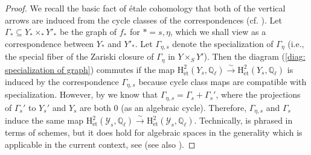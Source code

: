 \documentclass[11pt, letterpaper]{amsart}
\theoremstyle{plain}
\theoremstyle{definition}
\newcommand{\IQ}{\mathbb{Q}}
\newcommand{\<}{\langle}
\renewcommand{\>}{\rangle}
\newcommand{\et}{\mathrm{{\acute{e}}t}}
\newcommand{\sY}{\mathcal{Y}}
\renewcommand{\H}{\mathrm{H}}
\newcommand{\sto}{\stackrel{\sim}{\to}}
\begin{document}
\begin{proof}
    We recall the basic fact of \'etale cohomology that both of the vertical arrows are induced from the cycle classes of the correspondences (cf. \cite[Lem.\ 25.3]{milneLEC}). 
    Let $\Gamma_* \subseteq Y_* \times_* Y'_*$ be the graph of $f_*$ for $* = s, \eta$, which we shall view as a correspondence between $Y_*$ and $Y'_*$. Let $\Gamma_{\eta, s}$ denote the specialization of $\Gamma_\eta$ (i.e., the special fiber of the Zariski closure of $\Gamma_\eta$ in $Y \times_S Y'$). 
    Then the diagram (\ref{diag: specialization of graph}) commutes if the map $\H^2_\et(Y_s, \IQ_\ell) \sto \H^2_\et(Y_s, \IQ_\ell)$ is induced by the correspondence $\Gamma_{\eta, s}$ because cycle class maps are compatible with specialization. 
    However, by \cite[Thm~1]{MM64} we know that $\Gamma_{\eta, s} = \Gamma_s + \Gamma_s'$, where the projections of $\Gamma_s'$ to $Y_s'$ and $Y_s$ are both $0$ (as an algebraic cycle). 
    Therefore, $\Gamma_{\eta, s}$ and $\Gamma_s$ induce the same map $\H^2_\et(\sY_s, \IQ_\ell) \sto \H^2_\et(\sY_s, \IQ_\ell)$. 
    Technically, \cite[Thm~1]{MM64} is phrased in terms of schemes, but it does hold for algebraic spaces in the generality which is applicable in the current context, see \cite[Thm~A.2]{FLTZ} (see also \cite[Thm~5.4]{Matsumoto}).
\end{proof}
\end{document}
